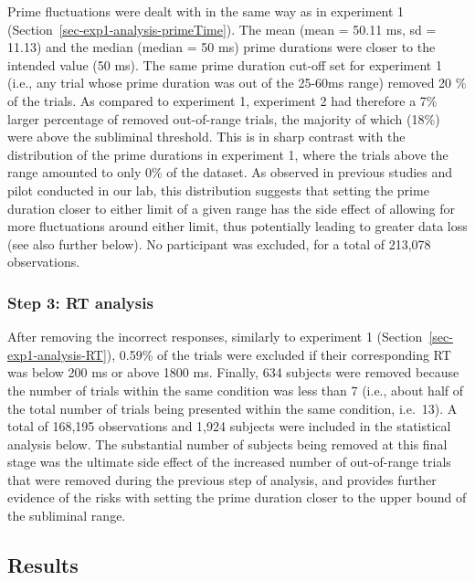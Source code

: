 \documentclass[
]{interact}
\begin{document}
Prime fluctuations were dealt with in the same way as in experiment 1
(Section~\ref{sec-exp1-analysis-primeTime}). The mean (mean = 50.11 ms,
sd = 11.13) and the median (median = 50 ms) prime durations were closer
to the intended value (50 ms). The same prime duration cut-off set for
experiment 1 (i.e., any trial whose prime duration was out of the
25-60ms range) removed 20 \% of the trials. As compared to experiment 1,
experiment 2 had therefore a 7\% larger percentage of removed
out-of-range trials, the majority of which (18\%) were above the
subliminal threshold. This is in sharp contrast with the distribution of
the prime durations in experiment 1, where the trials above the range
amounted to only 0\% of the dataset. As observed in previous studies and
pilot conducted in our lab, this distribution suggests that setting the
prime duration closer to either limit of a given range has the side
effect of allowing for more fluctuations around either limit, thus
potentially leading to greater data loss (see also further below). No
participant was excluded, for a total of 213,078 observations.

\subsubsection{Step 3: RT analysis}\label{sec-exp2-analysis-RT}

After removing the incorrect responses, similarly to experiment 1
(Section~\ref{sec-exp1-analysis-RT}), 0.59\% of the trials were excluded
if their corresponding RT was below 200 ms or above 1800 ms. Finally,
634 subjects were removed because the number of trials within the same
condition was less than 7 (i.e., about half of the total number of
trials being presented within the same condition, i.e.~13). A total of
168,195 observations and 1,924 subjects were included in the statistical
analysis below. The substantial number of subjects being removed at this
final stage was the ultimate side effect of the increased number of
out-of-range trials that were removed during the previous step of
analysis, and provides further evidence of the risks with setting the
prime duration closer to the upper bound of the subliminal range.

\subsection{Results}\label{sec-exp2-results}
\end{document}

